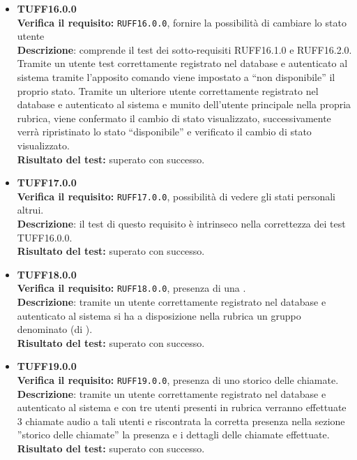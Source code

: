 \begin{itemize}
\item \textbf{TUFF16.0.0}\\
\textbf{Verifica il requisito:} \texttt{RUFF16.0.0}, fornire la possibilità di cambiare lo stato utente\\
\textbf{Descrizione}: comprende il test dei sotto-requisiti RUFF16.1.0 e RUFF16.2.0. Tramite un utente test correttamente registrato nel database e autenticato al sistema tramite l'apposito comando viene impostato a ``non disponibile'' il proprio stato. Tramite un ulteriore utente  correttamente registrato nel database e autenticato al sistema e munito dell'utente  principale nella propria rubrica, viene confermato il cambio di stato visualizzato, successivamente verrà ripristinato lo stato ``disponibile'' e verificato il cambio di stato visualizzato.\\
\textbf{Risultato del test:} superato con successo.

\item \textbf{TUFF17.0.0}\\
\textbf{Verifica il requisito:} \texttt{RUFF17.0.0}, possibilità di vedere gli stati personali altrui.\\
\textbf{Descrizione}: il test di questo requisito è intrinseco nella correttezza dei test TUFF16.0.0.\\
\textbf{Risultato del test:} superato con successo.

\item \textbf{TUFF18.0.0}\\ 
\textbf{Verifica il requisito:} \texttt{RUFF18.0.0}, presenza di una .\\
\textbf{Descrizione}: tramite un utente  correttamente registrato nel database e autenticato al sistema si ha a disposizione nella rubrica un gruppo denominato  (di ).\\
\textbf{Risultato del test:} superato con successo.

\item \textbf{TUFF19.0.0}\\
\textbf{Verifica il requisito:} \texttt{RUFF19.0.0}, presenza di uno storico delle chiamate.\\
\textbf{Descrizione}: tramite un utente  correttamente registrato nel database e autenticato al sistema e con tre utenti presenti in rubrica verranno effettuate 3 chiamate audio a tali utenti e riscontrata la corretta presenza nella sezione ''storico delle chiamate'' la presenza e i dettagli delle chiamate effettuate.\\
\textbf{Risultato del test:} superato con successo.


\end{itemize}
